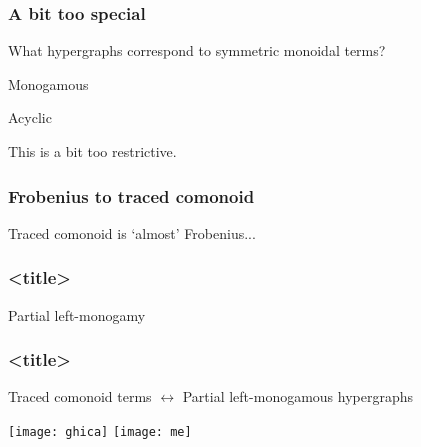 \begin{frame}
    \frametitle{A bit too special}

    \centering
    \LARGE
    What hypergraphs correspond to \alert{symmetric monoidal} terms?

    \pause
    \vspace{1em}

    \normalsize
    \begin{minipage}{0.45\textwidth}
        \begin{center}
            \alert{Monogamous}
        \end{center}
    \end{minipage}
    \begin{minipage}{0.45\textwidth}
        \begin{center}
            \alert{Acyclic}
        \end{center}
    \end{minipage}

    \vspace{1em}

    \pause
    \LARGE
    This is \alert{a bit too restrictive}.

\end{frame}

\begin{frame}
    \frametitle{Frobenius to traced comonoid}

    \centering
    \LARGE
    Traced comonoid is `almost' Frobenius...


\end{frame}

\begin{frame}
    \frametitle{<title>}

    Partial left-monogamy

\end{frame}

\begin{frame}
    \frametitle{<title>}

    Traced comonoid terms
    \(\leftrightarrow\)
    Partial left-monogamous hypergraphs

    \texttt{[image: ghica]}
    \texttt{[image: me]}

\end{frame}